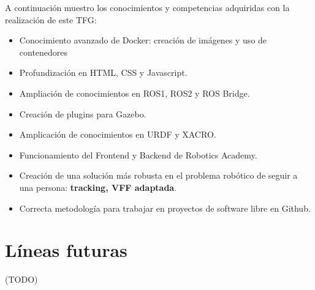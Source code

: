 A continuación muestro los conocimientos y competencias adquiridas con la realización de este TFG:
\begin{itemize}
	\item Conocimiento avanzado de Docker: creación de imágenes y uso de contenedores
	\item Profundización en HTML, CSS y Javascript.
	\item Ampliación de conocimientos en ROS1, ROS2 y ROS Bridge.
	\item Creación de plugins para Gazebo.
	\item Amplicación de conocimientos en URDF y XACRO.
	\item Funcionamiento del Frontend y Backend de Robotics Academy.
	\item Creación de una solución más robusta en el problema robótico de seguir a una persona: \textbf{tracking, VFF adaptada}.
	\item Correcta metodología para trabajar en proyectos de software libre en Github.
\end{itemize}

\section{Líneas futuras}
\label{sec:lineas_futuras}

(TODO)

